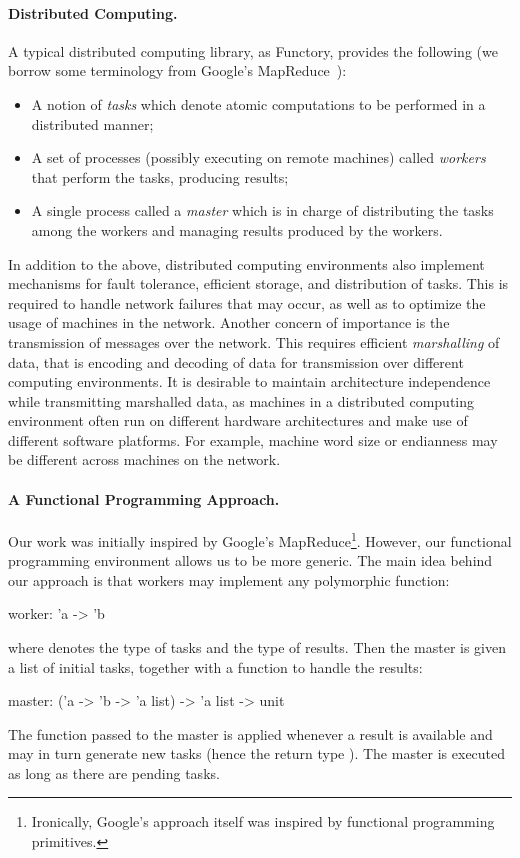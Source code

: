 \documentclass[a4paper,12pt]{article}
\newcommand{\functory}{\textsf{Functory}}
\begin{document}
\paragraph{Distributed Computing.}
A typical distributed computing library, as \functory,
provides the following (we
borrow some terminology from Google's MapReduce~\cite{mapreduce}):
\begin{itemize}
\item A notion of \emph{tasks} which denote atomic computations
  to be performed in a distributed manner; 
\item A set of processes (possibly executing on remote machines)
  called \emph{workers} that perform
  the tasks, producing results;
\item A single process called a \emph{master} which is in charge
  of distributing the tasks among the workers and managing results
  produced by the workers.
\end{itemize}
In addition to the above, distributed computing environments also
implement mechanisms for fault tolerance, efficient storage, and
distribution of tasks. This is required to handle network failures
that may occur, as well as to optimize the usage of machines in the
network. Another concern of importance is the transmission of messages
over the network. This requires efficient 
\emph{marshalling} of data, that is encoding and decoding of data 
for transmission over different computing environments.  It is desirable to
maintain architecture independence while transmitting marshalled data,
as machines in a distributed computing environment often run on
different hardware architectures and make use of different software
platforms. For example, machine word size or endianness may be different
across machines on the network.

\paragraph{A Functional Programming Approach.}
Our work was initially inspired by Google's
MapReduce\footnote{Ironically, Google's approach itself was inspired
  by functional programming primitives.}. However, our functional
programming environment allows us to be more generic. 
The main idea behind our approach is that
workers may implement any polymorphic function:
\begin{ocaml}
  worker: 'a -> 'b
\end{ocaml}
where  denotes the type of tasks and  the type of results.
Then the master is given a list of initial tasks, together with a
function to handle the results:
\begin{ocaml}
  master: ('a -> 'b -> 'a list) -> 'a list -> unit
\end{ocaml}
The function passed to the master is applied whenever a result is
available and may in turn generate new tasks (hence the return type
).  The master is executed as long as there are pending
tasks.
\end{document}
